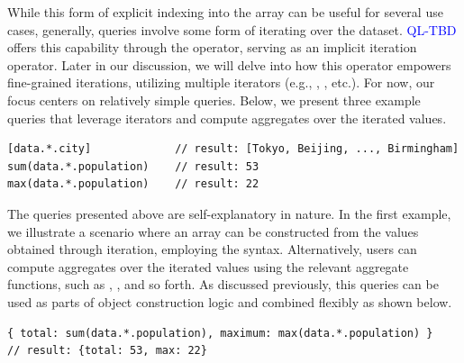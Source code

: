 \documentclass[runningheads]{llncs}
\newcommand{\lang}{\textcolor{blue}{QL-TBD}}
\begin{document}
While this form of explicit indexing into the array can be useful for several
use cases, generally, queries involve some form of iterating over the dataset.
\lang{} offers this capability through the \inline{*} operator,
serving as an implicit iteration operator.
Later in our discussion, we will delve into how this operator empowers fine-grained
iterations, utilizing multiple iterators
(e.g., , , etc.).
For now, our focus centers on relatively simple queries.
Below, we present three example queries that leverage iterators and compute
aggregates over the iterated values.

\begin{lstlisting}[style=JavaScript, columns=flexible]
[data.*.city]             // result: [Tokyo, Beijing, ..., Birmingham]
sum(data.*.population)    // result: 53
max(data.*.population)    // result: 22
\end{lstlisting}

The queries presented above are self-explanatory in nature.
In the first example, we illustrate a scenario where an array can be constructed
from the values obtained through iteration, employing the \inline{[...]} syntax.
Alternatively, users can compute aggregates over the iterated values using the
relevant aggregate functions, such as , , and so forth.
As discussed previously, this queries can be used as parts of object
construction logic and combined flexibly as shown below.

\begin{lstlisting}[style=JavaScript, columns=flexible, numbers=none]
{ total: sum(data.*.population), maximum: max(data.*.population) }
// result: {total: 53, max: 22}
\end{lstlisting}


\end{document}
